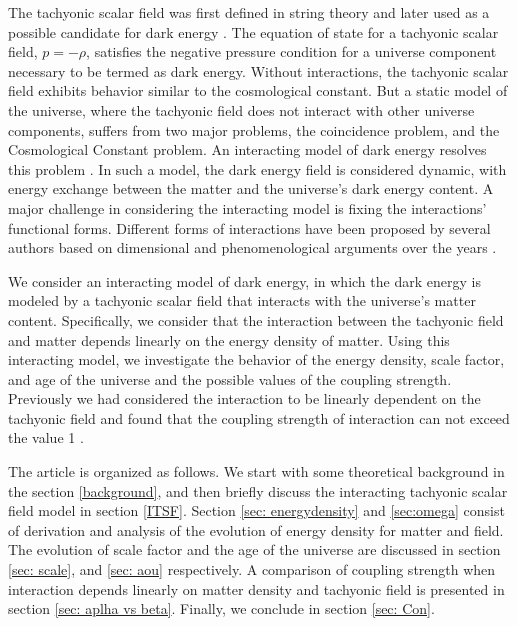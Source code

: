 \documentclass[preprint,aps,floatfix]{revtex4}
\begin{document}
The tachyonic scalar field was first defined in string theory \cite{Sen_2002,Sen1_2002,Sen2_2002} and later used as a possible candidate for dark energy \cite{padmanabhan2002can,sadeghi2014phenomenological}. The equation of state for a tachyonic scalar field, $p = - \rho$, satisfies the negative pressure condition for a universe component necessary to be termed as dark energy. Without interactions, the tachyonic scalar field exhibits behavior
similar to the cosmological constant. But a static model of the universe, where the tachyonic field does not interact with other universe components, suffers from two major problems, the coincidence problem, and the Cosmological Constant problem. An interacting model of dark energy resolves this problem \cite{Chimento_2010,Chimento_2008,Bertolami_2012,Wang_2007,lu2012investigate,Farajollahi_2012,Zimdahl_2012,Yang_2018,Cao_2011,Di_Valentino_2020,Verma_2012,Verma_2013,V_liviita_2010,Pan_2018,Amendola_2018,B_gu__2019,Pan_2019,Papagiannopoulos_2020,Savastano_2019,von_Marttens_2019,yang2019reconstructing,Asghari_2019}. In such a model, the dark energy field is considered dynamic, with energy exchange between the matter and the universe's dark energy content. A major challenge in considering the interacting model is fixing the interactions' functional forms. Different forms of interactions have been proposed by several authors based on dimensional and phenomenological arguments over the years \cite{Chimento_2010,Chimento_2008,Bertolami_2012,Wang_2007,lu2012investigate,Farajollahi_2012,Zimdahl_2012,Yang_2018,Di_Valentino_2020,shahalam2017dynamics,shahalam2015dynamics}.

We consider an interacting model of dark energy, in which the dark energy is modeled by a tachyonic scalar field that interacts with the universe's matter content. Specifically, we consider that the interaction between the tachyonic field and matter depends linearly on the energy density of matter. Using this interacting model, we investigate the behavior of the energy density, scale factor, and age of the universe and the possible values of the coupling strength. Previously we had considered the interaction to be linearly dependent on the tachyonic field and found that the coupling strength of interaction can not exceed the value 1 \cite{kundu2021interacting}.

The article is organized as follows. We start with some theoretical background in the section
\ref{background}, and then briefly discuss the interacting tachyonic scalar field model in section \ref{ITSF}. Section
\ref {sec: energydensity} and \ref{sec:omega} consist of derivation and analysis of the evolution of energy density for matter and
field. The evolution of scale factor and the age of the universe are discussed in section \ref{sec: scale}, and \ref{sec: aou} respectively. A comparison of coupling strength when interaction depends linearly on matter
density and tachyonic field is presented in section \ref{sec: aplha vs beta}. Finally, we conclude in section \ref{sec: Con}.
\end{document}
